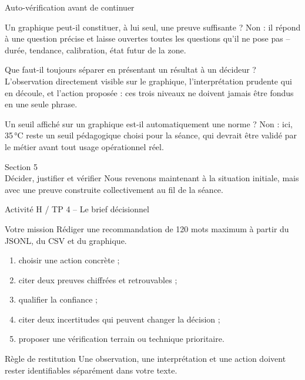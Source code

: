 \documentclass[aspectratio=169]{beamer}
\begin{document}
\begin{frame}{Auto-vérification avant de continuer}
  \small
  \begin{block}{Un graphique peut-il constituer, à lui seul, une preuve suffisante ?}
    Non : il répond à une question précise et laisse ouvertes toutes les questions qu'il ne pose pas -- durée, tendance, calibration, état futur de la zone.
  \end{block}
  \begin{block}{Que faut-il toujours séparer en présentant un résultat à un décideur ?}
    L'observation directement visible sur le graphique, l'interprétation prudente qui en découle, et l'action proposée : ces trois niveaux ne doivent jamais être fondus en une seule phrase.
  \end{block}
  \begin{block}{Un seuil affiché sur un graphique est-il automatiquement une norme ?}
    Non : ici, 35\,°C reste un seuil pédagogique choisi pour la séance, qui devrait être validé par le métier avant tout usage opérationnel réel.
  \end{block}
\end{frame}

\begin{frame}[plain]
  \centering
  \Huge Section 5\\[3mm]
  \Large Décider, justifier et vérifier
  \vfill
  \normalsize Nous revenons maintenant à la situation initiale, mais avec une preuve construite collectivement au fil de la séance.
\end{frame}

\begin{frame}{Activité H / TP 4 -- Le brief décisionnel}
  \begin{block}{Votre mission}
    Rédiger une recommandation de 120 mots maximum à partir du JSONL, du CSV et du graphique.
  \end{block}
  \begin{enumerate}
    \item choisir une action concrète ;
    \item citer deux preuves chiffrées et retrouvables ;
    \item qualifier la confiance ;
    \item citer deux incertitudes qui peuvent changer la décision ;
    \item proposer une vérification terrain ou technique prioritaire.
  \end{enumerate}
  \begin{alertblock}{Règle de restitution}
    Une observation, une interprétation et une action doivent rester identifiables séparément dans votre texte.
  \end{alertblock}
\end{frame}
\end{document}
